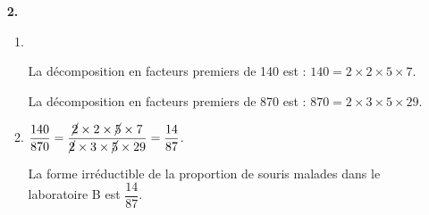 \begin{enumerate}		
\item[\textbf{2.}] 
	\begin{enumerate}
		\item  ~	
	\vspace{-0.5cm}
	\hspace{-0.3cm}%

\vspace{0.4cm}

La décomposition en facteurs premiers de 140 est : \quad $140=2\times2\times5\times7$.

\hspace{-0.3cm}%

\vspace{0.2cm}

La décomposition en facteurs premiers de 870 est : \quad $870 = 2 \times 3\times 5 \times 29$.
		\item $\dfrac{140}{870}=\dfrac{\cancel{2}\times2\times\cancel{5}\times7}{\cancel{2}\times3\times\cancel{5}\times29} = \dfrac{14}{87}$.
		
La forme irréductible de la proportion de souris malades dans le laboratoire B est $\dfrac{14}{87}$.
	\end{enumerate}
\end{enumerate}

\vspace{0,5cm}

